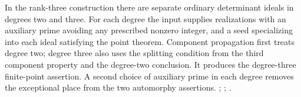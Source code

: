 In the rank-three construction there are separate ordinary
determinant ideals in degrees two and three. For each degree
the input supplies realizations with an auxiliary prime avoiding
any prescribed nonzero integer, and a seed specializing into
each ideal satisfying the point theorem. Component propagation
first treats degree two; degree three also uses the splitting
condition from the third component property and the degree-two
conclusion. It produces the degree-three finite-point assertion.
A second choice of auxiliary prime in each degree removes the
exceptional place from the two automorphy assertions.
;
;
.

